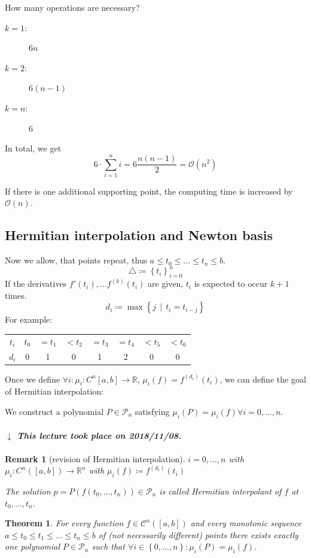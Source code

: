 \documentclass[a4paper]{article}
\newcounter{lecref}[section]
\numberwithin{lecref}{section}
\theoremstyle{break}
\newtheorem{thm}[lecref]{Theorem}
\newtheorem*{Remark}{Remark}
\newcommand{\dateref}[1]{%
  \begin{mdframed}[backgroundcolor=gray!10,innerbottommargin=0pt,innertopmargin=0pt]
    \paragraph{\textit{$\downarrow$ This lecture took place on #1.}}%
  \end{mdframed}%
}
\newcommand{\Set}[1]{\left\{#1\right\}}
\newcommand{\SetDef}[2]{\left\{#1\,\mid\,#2\right\}}
\begin{document}
How many operations are necessary?
\begin{description}
  \item[$k = 1$:]  $6n$
  \item[$k = 2$:]  $6(n - 1)$
  \item[$k = n$:]  $6$
\end{description}
In total, we get
\[ 6 \cdot \sum_{i=1}^n i = 6 \frac{n (n - 1)}{2} = \mathcal{O}(n^2) \]

If there is one additional supporting point, the computing time is increased by $\mathcal O(n)$.

\subsection{Hermitian interpolation and Newton basis}

Now we allow, that points repeat, thus $a \leq t_0 \leq \dots \leq t_n \leq b$.
\[ \triangle \coloneqq \Set{t_i}_{i=0}^n \]
If the derivatives $f'(t_i), \dots f^{(k)}(t_i)$ are given,
$t_i$ is expected to occur $k+1$ times.
\[ d_i \coloneqq \max\SetDef{j}{t_i = t_{i-j}} \]
For example:
\begin{center}
  \begin{tabular}{c|ccccccc}
    $t_i$ & $t_0$ & $= t_1$ & $< t_2$ & $= t_3$ & $= t_4$ & $< t_5$ & $< t_6$ \\
    $d_i$ & 0 & 1 & 0 & 1 & 2 & 0 & 0
  \end{tabular}
\end{center}
Once we define $\forall i: \mu_i: C^n[a,b] \to \mathbb R$, $\mu_i(f) = f^{(d_i)}(t_i)$,
we can define the goal of Hermitian interpolation:

We construct a polynomial $P \in \mathcal P_n$ satisfying $\mu_i(P) = \mu_i(f) \forall i = 0, \dots, n$.

\dateref{2018/11/08}

\begin{Remark}[revision of Hermitian interpolation]
  $i = 0, \dots, n$ with $\mu_i: C^n([a,b]) \to \mathbb R^n$ with $\mu_i(f) \coloneqq f^{(d_i)}(t_i)$

  The solution $p = P(f(t_0, \dots, t_n)) \in \mathcal P_n$ is called \emph{Hermitian interpolant} of $f$ at $t_0, \dots, t_n$.
\end{Remark}

\begin{thm}
  \label{theorem:4-7}
  For every function $f \in \mathcal C^n([a,b])$ and every monotonic sequence $a \leq t_0 \leq t_1 \leq \dots \leq t_n \leq b$
  of (not necessarily different) points there exists exactly one polynomial $P \in \mathcal P_n$ such that $\forall i \in \Set{0, \dots, n}: \mu_i(P) = \mu_i(f)$.
\end{thm}
\end{document}
